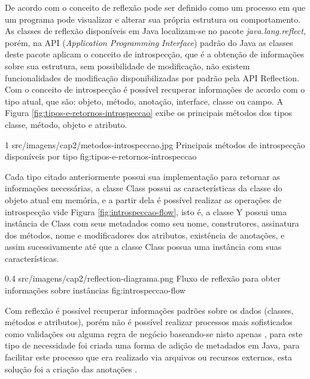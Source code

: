 \par De acordo com  o conceito de reflexão pode ser definido como um processo em que um programa pode visualizar e alterar sua própria estrutura ou comportamento. As classes de reflexão disponíveis em Java localizam-se no pacote \textit{java.lang.reflect}, porém, na API (\textit{Application Programming Interface}) padrão do Java as classes deste pacote aplicam o conceito de introspecção, que é a obtenção de informações sobre sua estrutura, sem possibilidade de modificação, não existem funcionalidades de modificação disponibilizadas por padrão pela API Reflection. Com o conceito de introspecção é possível recuperar informações de acordo com o tipo atual, que são: objeto, método, anotação, interface, classe ou campo. A Figura \ref{fig:tipos-e-retornos-introspeccao} exibe os principais métodos dos tipos classe, método, objeto e atributo. 

\begin{image}
{1} %
{src/imagens/cap2/metodos-introspeccao.jpg} %
{Principais métodos de introspecção disponíveis por tipo} %
{fig:tipos-e-retornos-introspeccao} %
{} %
\end{image}

\par Cada tipo citado anteriormente possui sua implementação para retornar as informações necessárias, a classe Class possui as características da classe do objeto atual em memória, e a partir dela é possível realizar as operações de introspecção vide Figura \ref{fig:introspeccao-flow}, isto é, a classe Y possui uma instância de Class com seus metadados como seu nome, construtores, assinatura dos métodos, nome e modificadores dos atributos, existência de anotações, e assim sucessivamente até que a classe Class possua uma instância com suas características.

\begin{image}
{0.4} %
{src/imagens/cap2/reflection-diagrama.png} %
{Fluxo de reflexão para obter informações sobre instâncias} %
{fig:introspeccao-flow} %
{} %
\end{image}

\par Com reflexão é possível recuperar informações padrões sobre os dados (classes, métodos e atributos), porém não é possível realizar processos mais sofisticados como validações ou alguma regra de negócio baseando-se nisto apenas \cite{guerra2010architectural}, para este tipo de necessidade foi criada uma forma de adição de metadados em Java, para facilitar este processo que era realizado via arquivos ou recursos externos, esta solução foi a criação das anotações \cite{jcp175metadata2002facility}.

